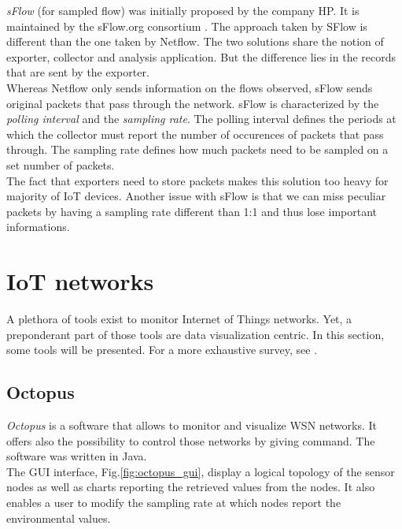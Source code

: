 \textit{sFlow} (for sampled flow) was initially proposed by the company HP. It is maintained by the sFlow.org consortium \cite{website:sflow}. The approach taken by SFlow is different than the one taken by Netflow. The two solutions share the notion of exporter, collector and analysis application. But the difference lies in the records that are sent by the exporter. \\

Whereas Netflow only sends information on the flows observed, sFlow sends original packets that pass through the network. sFlow is characterized by the \textit{polling interval} and the \textit{sampling rate}. The polling interval defines the periods at which the collector must report the number of occurences of packets that pass through. The sampling rate defines how much packets need to be sampled on a set number of packets. \\

The fact that exporters need to store packets makes this solution too heavy for majority of IoT devices. Another issue with sFlow is that we can miss peculiar packets by having a sampling rate different than 1:1 and thus lose important informations.

\section{IoT networks}

A plethora of tools exist to monitor Internet of Things networks. Yet, a preponderant part of those tools are data visualization centric. In this section, some tools will be presented. For a more exhaustive survey, see \cite{parbat2010data}.

\subsection{Octopus}

\textit{Octopus} \cite{jurdak2011octopus} is a software that allows to monitor and visualize WSN networks. It offers also the possibility to control those networks by giving command. The software was written in Java. \\

The GUI interface, Fig.\ref{fig:octopus_gui}, display a logical topology of the sensor nodes as well as charts reporting the retrieved values from the nodes. It also enables a user to modify the sampling rate at which nodes report the environmental values. \\

